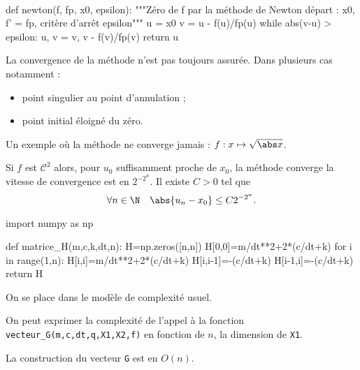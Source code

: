 \exer{[SYS-002]}
\setcounter{numques}{0}~\\


\question{}

\begin{pyverbatim}
def newton(f, fp, x0, epsilon):
    """Zéro de f par la méthode de Newton
       départ : x0, f' = fp, critère d'arrêt epsilon"""
    u = x0
    v = u - f(u)/fp(u)
    while abs(v-u) > epsilon:
        u, v = v, v - f(v)/fp(v)
    return u
\end{pyverbatim}

\question{}

La convergence de la méthode n'est pas toujours assurée. Dans plusieurs cas notamment : 
  \begin{itemize}
    \item point singulier au point d'annulation ;
    \item point initial éloigné du zéro.
  \end{itemize}
Un exemple où la méthode ne converge jamais : $f : x \mapsto \sqrt{\abs x}$. 
  
Si $f$ est $\mathscr{C}^2$ alors, pour $u_{0}$ suffisamment proche
de $x_{0}$, la méthode converge la vitesse de convergence est en $2^{-2^{n}}$.
Il existe $C>0$ tel que
\begin{equation*}
  \forall n\in\N\quad \abs{u_{n} - x_{0}} \leq C 2^{-2^{n}}.
\end{equation*}

\question{} 

\begin{pyverbatim}
import numpy as np

def matrice_H(m,c,k,dt,n):
    H=np.zeros([n,n])
    H[0,0]=m/dt**2+2*(c/dt+k)
    for i in range(1,n):
        H[i,i]=m/dt**2+2*(c/dt+k)
        H[i,i-1]=-(c/dt+k)
        H[i-1,i]=-(c/dt+k)
    return H
\end{pyverbatim}

\question{} 
On se place dans le modèle de complexité usuel.

On peut exprimer la complexité de l'appel à la fonction \texttt{vecteur\_G(m,c,dt,q,X1,X2,f)} en fonction de $n$, la dimension de \texttt{X1}. 

La construction du vecteur \texttt{G} est en $O(n)$.

